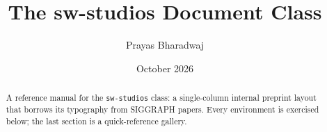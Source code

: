 \documentclass[personal]{sw-studios}  %
\title{The sw-studios Document Class}
\author{Prayas Bharadwaj}
\date{October 2026}
\begin{document}
\maketitle

\begin{abstract}
A reference manual for the \texttt{sw-studios} class: a single-column internal
preprint layout that borrows its typography from SIGGRAPH papers. Every
environment is exercised below; the last section is a quick-reference gallery.
\end{abstract}




\end{document}
